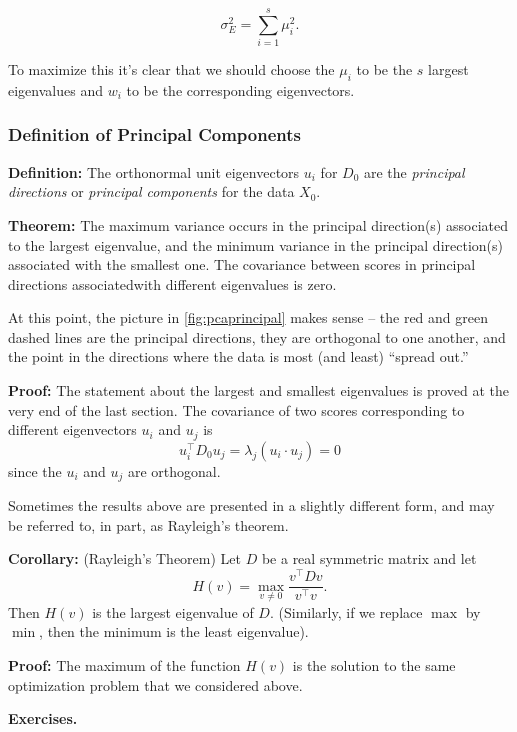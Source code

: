 \documentclass[
]{article}
\begin{document}
\[
\sigma_{E}^2 = \sum_{i=1}^{s} \mu_{i}^2.
\]

To maximize this it's clear that we should choose the \(\mu_{i}\) to be
the \(s\) largest eigenvalues and \(w_{i}\) to be the corresponding
eigenvectors.

\hypertarget{definition-of-principal-components}{%
\subsubsection{Definition of Principal
Components}\label{definition-of-principal-components}}

\textbf{Definition:} The orthonormal unit eigenvectors \(u_{i}\) for
\(D_{0}\) are the \emph{principal directions} or \emph{principal
components} for the data \(X_{0}\).

\textbf{Theorem:} The maximum variance occurs in the principal
direction(s) associated to the largest eigenvalue, and the minimum
variance in the principal direction(s) associated with the smallest one.
The covariance between scores in principal directions associatedwith
different eigenvalues is zero.

At this point, the picture in \cref{fig:pcaprincipal} makes sense -- the
red and green dashed lines are the principal directions, they are
orthogonal to one another, and the point in the directions where the
data is most (and least) ``spread out.''

\textbf{Proof:} The statement about the largest and smallest eigenvalues
is proved at the very end of the last section. The covariance of two
scores corresponding to different eigenvectors \(u_{i}\) and \(u_{j}\)
is \[u_{i}^{\intercal}D_{0}u_{j} = \lambda_{j}(u_{i}\cdot u_{j}) = 0\]
since the \(u_{i}\) and \(u_{j}\) are orthogonal.

Sometimes the results above are presented in a slightly different form,
and may be referred to, in part, as Rayleigh's theorem.

\textbf{Corollary:} (Rayleigh's Theorem) Let \(D\) be a real symmetric
matrix and let \[
H(v) = \max_{v\not = 0}\frac{v^{\intercal}Dv}{v^{\intercal}v}.
\] Then \(H(v)\) is the largest eigenvalue of \(D\). (Similarly, if we
replace \(\max\) by \(\min\), then the minimum is the least eigenvalue).

\textbf{Proof:} The maximum of the function \(H(v)\) is the solution to
the same optimization problem that we considered above.

\textbf{Exercises.}
\end{document}
